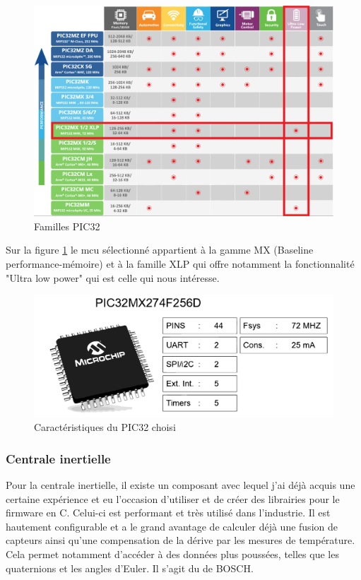 \begin{figure}[h]
	\centering
	\includegraphics[width=0.65\linewidth]{../figures/pre_etude/familles_pic32}
	\caption{Familles PIC32}
	\label{fig:famillespic32}
\end{figure}

Sur la figure \ref{fig:famillespic32} le \gls{mcu} sélectionné appartient à la gamme MX (Baseline performance-mémoire) et à la famille XLP qui offre notamment la fonctionnalité "Ultra low power" qui est celle qui nous intéresse.

\begin{figure}[h]
	\centering
	\includegraphics[width=0.7\linewidth]{../figures/pre_etude/Carac_PIC32}
	\caption{Caractéristiques du PIC32 choisi}
	\label{fig:caracpic32}
\end{figure}

\clearpage
\subsubsection{Centrale inertielle} 
Pour la centrale inertielle, il existe un composant avec lequel j'ai déjà acquis une certaine expérience et eu l'occasion d'utiliser et de créer des librairies pour le firmware en C. Celui-ci est performant et très utilisé dans l'industrie. Il est hautement configurable et a le grand avantage de calculer déjà une fusion de capteurs ainsi qu'une compensation de la dérive par les mesures de température. Cela permet notamment d'accéder à des données plus poussées, telles que les quaternions et les angles d'Euler. Il s'agit du  de BOSCH.
 

